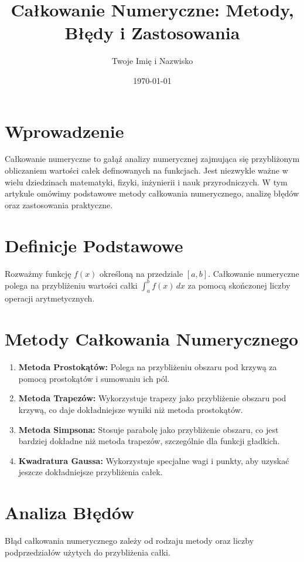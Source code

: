 \documentclass[12pt]{article}
\title{Całkowanie Numeryczne: Metody, Błędy i Zastosowania}
\author{Twoje Imię i Nazwisko}
\date{\today}
\begin{document}
\maketitle

\section{Wprowadzenie}
Całkowanie numeryczne to gałąź analizy numerycznej zajmująca się przybliżonym obliczaniem wartości całek definowanych na funkcjach. Jest niezwykle ważne w wielu dziedzinach matematyki, fizyki, inżynierii i nauk przyrodniczych. W tym artykule omówimy podstawowe metody całkowania numerycznego, analizę błędów oraz zastosowania praktyczne.

\section{Definicje Podstawowe}
\begin{definition}
Rozważmy funkcję $f(x)$ określoną na przedziale $[a, b]$. Całkowanie numeryczne polega na przybliżeniu wartości całki $\int_{a}^{b} f(x) \,dx$ za pomocą skończonej liczby operacji arytmetycznych.
\end{definition}

\section{Metody Całkowania Numerycznego}
\begin{enumerate}
  \item \textbf{Metoda Prostokątów:} Polega na przybliżeniu obszaru pod krzywą za pomocą prostokątów i sumowaniu ich pól.
  
  \item \textbf{Metoda Trapezów:} Wykorzystuje trapezy jako przybliżenie obszaru pod krzywą, co daje dokładniejsze wyniki niż metoda prostokątów.
  
  \item \textbf{Metoda Simpsona:} Stosuje parabolę jako przybliżenie obszaru, co jest bardziej dokładne niż metoda trapezów, szczególnie dla funkcji gładkich.
  
  \item \textbf{Kwadratura Gaussa:} Wykorzystuje specjalne wagi i punkty, aby uzyskać jeszcze dokładniejsze przybliżenia całek.
\end{enumerate}

\section{Analiza Błędów}
\begin{theorem}
Błąd całkowania numerycznego zależy od rodzaju metody oraz liczby podprzedziałów użytych do przybliżenia całki.
\end{theorem}
\end{document}
